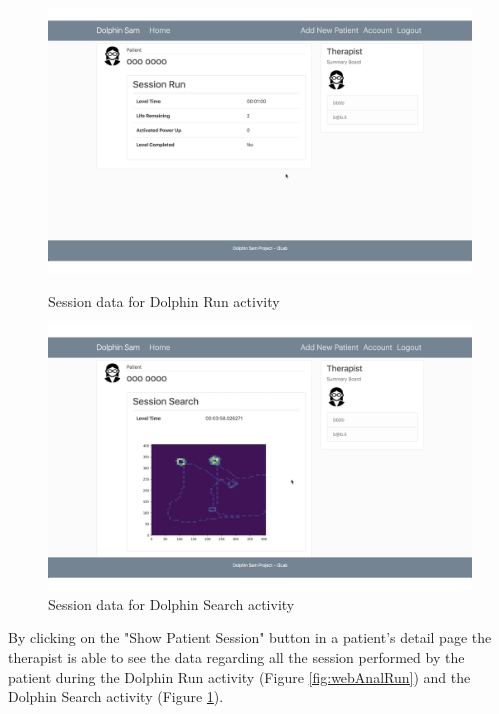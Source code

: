 \begin{figure}[h]
	\centering
	\begin{minipage}[b]{0.49\textwidth}
		\includegraphics[width=\textwidth]{images/UX/website/11-runAnal}
		\caption{Session data for Dolphin Run activity}
		\label{fig:webAnalRun}
	\end{minipage}
	\begin{minipage}[b]{0.49\textwidth}
		\includegraphics[width=\textwidth]{images/UX/website/12-searchAnal}
		\caption{Session data for Dolphin Search activity}
		\label{fig:webAnalSearch}
	\end{minipage}
\end{figure}

By clicking on the "Show Patient Session" button in a patient's detail page the therapist is able to see the data regarding all the session performed by the patient during the Dolphin Run activity (Figure \ref{fig:webAnalRun}) and the Dolphin Search activity (Figure \ref{fig:webAnalSearch}).



